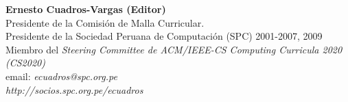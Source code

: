 \begin{center}
\textbf{Ernesto Cuadros-Vargas (Editor)}\\ 
Presidente de la Comisión de Malla Curricular.\\
Presidente de la Sociedad Peruana de Computación (SPC) 2001-2007, 2009\\
Miembro del {\it Steering Committee de ACM/IEEE-CS Computing Curricula 2020 (CS2020)}\\
email: \textit{ecuadros@spc.org.pe}\\
\textit{http://socios.spc.org.pe/ecuadros}
\end{center}
